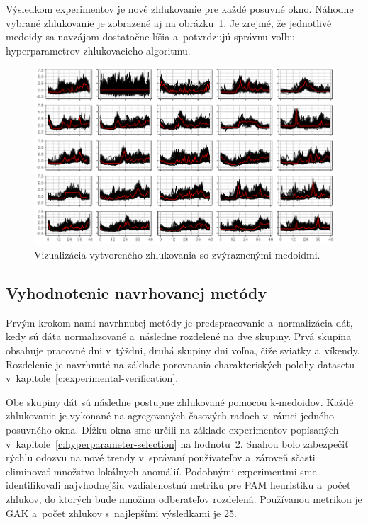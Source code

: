\documentclass[a4paper,twoside,slovak,12pt,appendix]{article}
\begin{document}
\noindent
Výsledkom experimentov je nové zhlukovanie pre každé posuvné okno. Náhodne
vybrané zhlukovanie je zobrazené aj na obrázku~\ref{fig:clustering-workdays}.
Je zrejmé, že jednotlivé medoidy sa navzájom dostatočne líšia a~potvrdzujú
správnu voľbu hyperparametrov zhlukovacieho algoritmu.

\begin{figure}[htbp]
  \centering
  \includegraphics[width=\textwidth]{clustering_workdays.png}
  \caption{Vizualizácia vytvoreného zhlukovania so zvýraznenými medoidmi.}
	\label{fig:clustering-workdays}
\end{figure}

\subsection{Vyhodnotenie navrhovanej metódy}
Prvým krokom nami navrhnutej metódy je predspracovanie a~normalizácia dát, kedy
sú dáta normalizované a~následne rozdelené na dve skupiny. Prvá skupina obsahuje
pracovné dni v~týždni, druhá skupiny dni voľna, čiže sviatky a~víkendy.
Rozdelenie je navrhnuté na základe porovnania charakteriských polohy datasetu
v~kapitole~\ref{c:experimental-verification}.

Obe skupiny dát sú následne postupne zhlukované pomocou k-medoidov. Každé
zhlukovanie je vykonané na agregovaných časových radoch v~rámci jedného
posuvného okna. Dĺžku okna sme určili na základe experimentov popísaných
v~kapitole~\ref{c:hyperparameter-selection} na hodnotu~2. Snahou bolo zabezpečiť
rýchlu odozvu na nové trendy v~správaní používateľov a~zároveň sčasti eliminovať
množstvo lokálnych anomálií. Podobnými experimentmi sme identifikovali
najvhodnejšiu vzdialenostnú metriku pre PAM heuristiku a~počet zhlukov, do
ktorých bude množina odberateľov rozdelená. Používanou metrikou je GAK a~počet
zhlukov s~najlepšími výsledkami je 25.
\end{document}
